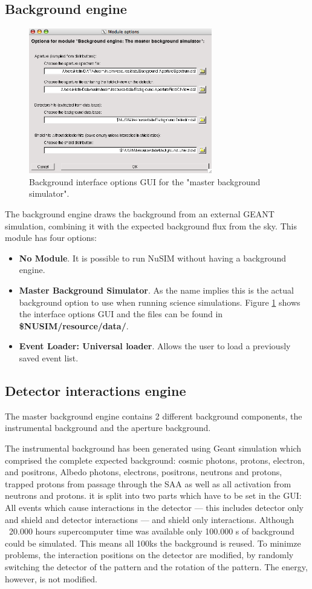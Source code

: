 \subsection{Background engine}
\begin{figure}[tb]
\begin{center}
\includegraphics[width=8cm]{images/backgroundgui.png}  
\caption{Background interface options GUI for the "master background simulator".}
\label{bkggui} 
\end{center}
\end{figure}
The background engine draws the background from an external GEANT simulation, combining it with the expected background flux from the sky. This module has four options:
\begin{itemize}
\item \textbf{No Module}. It is possible to run NuSIM without having a background engine.
\item \textbf{Master Background Simulator}. As the name implies this is the actual background option to use when running science simulations. Figure \ref{bkggui} shows the interface options GUI and the files can be found in \textbf{\${NUSIM}/resource/data/}.
\item \textbf{Event Loader: Universal loader}. Allows the user to load a previously saved event list.
\end{itemize}
\subsection{Detector interactions engine}

The master background engine contains 2 different background components, the instrumental background and the aperture background.

The instrumental background has been generated using Geant simulation which comprised the complete expected background: cosmic photons, protons, electron, and positrons, Albedo photons, electrons, positrons, neutrons and protons, trapped protons from passage through the SAA as well as all activation from neutrons and protons. it is split into two parts which have to be set in the GUI: All events which cause interactions in the detector --- this includes detector only and shield and detector interactions --- and shield only interactions.
Although ~20.000 hours supercomputer time was available only 100.000 s of background could be simulated. This means all 100ks the background is reused. 
To minimze problems, the interaction positions on the detector are modified, by randomly switching the detector of the pattern and the rotation of the pattern.
The energy, however, is not modified. 

